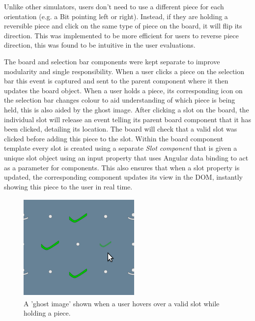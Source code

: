 \documentclass{l4proj}
\begin{document}
Unlike other simulators, users don't need to use a different piece for each orientation (e.g. a Bit pointing left or right). Instead, if they are holding a reversible piece and click on the same type of piece on the board, it will flip its direction. This was implemented to be more efficient for users to reverse piece direction, this was found to be intuitive in the user evaluations. 

The board and selection bar components were kept separate to improve modularity and single responsibility. When a user clicks a piece on the selection bar this event is captured and sent to the parent component where it then updates the board object. When a user holds a piece, its corresponding icon on the selection bar changes colour to aid understanding of which piece is being held, this is also aided by the ghost image. After clicking a slot on the board, the individual slot will release an event telling its parent board component that it has been clicked, detailing its location. The board will check that a valid slot was clicked before adding this piece to the slot. Within the board component template every slot is created using a separate \emph{Slot component} that is given a unique slot object using an input property that uses Angular data binding to act as a parameter for components. This also ensures that when a slot property is updated, the corresponding component updates its view in the DOM, instantly showing this piece to the user in real time.



\begin{figure}
    \centering
    \includegraphics[width=0.4\linewidth]{images/ghostImage.png}
    \caption{A 'ghost image' shown when a user hovers over a valid slot while holding a piece.}
    \label{fig:ghostPiece}
\end{figure}
\end{document}
